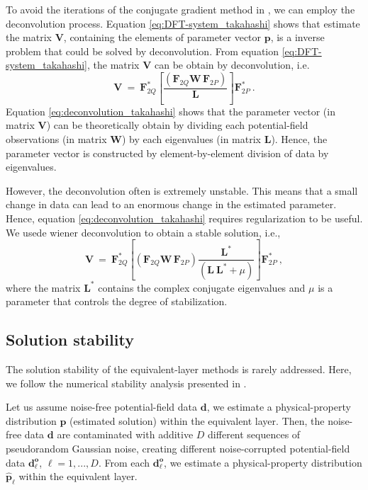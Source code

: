 To avoid the  iterations of the conjugate gradient method in \cite{takahashi2022}, we can employ 
the deconvolution process.
Equation \ref{eq:DFT-system_takahashi} shows that estimate the  matrix $\mathbf{V}$,
containing the elements of parameter vector $\mathbf{p}$, is a inverse problem that could be 
solved by deconvolution.
From equation \ref{eq:DFT-system_takahashi}, the  matrix $\mathbf{V}$ can be obtain by 
deconvolution, i.e.
\begin{equation}
\mathbf{V} \: = \:  \mathbf{F}_{2Q}^{\ast} \left[ 
\frac{\left(\mathbf{F}_{2Q} \mathbf{W} \, \mathbf{F}_{2P} \right) }{\mathbf{L}}
\right] \mathbf{F}_{2P}^{\ast} \: .
\label{eq:deconvolution_takahashi}
\end{equation}
Equation \ref{eq:deconvolution_takahashi} shows that the parameter vector (in matrix $\mathbf{V}$) 
can be theoretically obtain by dividing each potential-field observations (in matrix $\mathbf{W}$)
by each eigenvalues (in matrix $\mathbf{L}$).
Hence, the parameter vector is constructed by element-by-element division of data by eigenvalues.

However, the deconvolution often is extremely unstable. 
This means that a small change in data can lead to an enormous change in the estimated parameter.
Hence, equation \ref{eq:deconvolution_takahashi} requires regularization to be useful.
We usede wiener deconvolution to obtain a stable solution, i.e.,
\begin{equation}
\mathbf{V} \: = \:  \mathbf{F}_{2Q}^{\ast} \left[ 
\left(\mathbf{F}_{2Q} \mathbf{W} \, \mathbf{F}_{2P} \right)  
\frac{\mathbf{L}^{\ast}}{ \left(\mathbf{L} \: \mathbf{L}^{\ast} + \mu \right)}
\right] \mathbf{F}_{2P}^{\ast} \: ,
\label{eq:wiener_takahashi}
\end{equation}
where the matrix $\mathbf{L}^{\ast}$ contains the complex conjugate eigenvalues and
$\mu$ is a parameter that controls the degree of stabilization. 


\subsection{Solution stability}

The solution stability of the equivalent-layer methods is rarely addressed.
Here, we follow the numerical stability analysis presented in \cite{siqueira-etal2017}.

Let us assume noise-free potential-field data $\mathbf{d}$, 
we estimate a physical-property distribution $\mathbf{p}$ (estimated solution) within the equivalent layer.
Then, the  noise-free data $\mathbf{d}$ are contaminated with additive $D$ different sequences of 
pseudorandom Gaussian noise, creating  different noise-corrupted potential-field data
$\mathbf{d}^\mathbf{o}_\ell$, $\ell = 1, ..., D$.
From each $\mathbf{d}^\mathbf{o}_\ell$, we estimate a physical-property distribution 
$\mathbf{\hat{p}}_\ell$ within the equivalent layer. 

